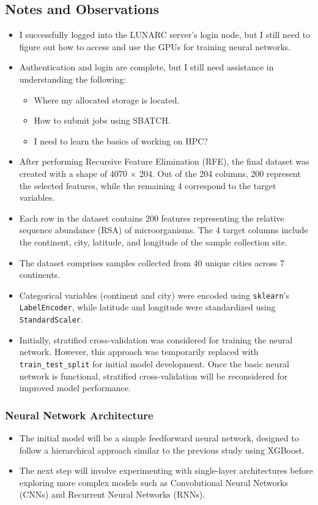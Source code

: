 \documentclass{article}
\begin{document}
\subsection*{Notes and Observations}
\begin{itemize}
    \item I successfully logged into the LUNARC server’s login node, but I still need to figure out how to access and use the GPUs for training neural networks.
    \item Authentication and login are complete, but I still need assistance in understanding the following:
    \begin{itemize}
        \item Where my allocated storage is located.
        \item How to submit jobs using SBATCH.
        \item I need to learn the basics of working on HPC?
    \end{itemize}
    \item After performing Recursive Feature Elimination (RFE), the final dataset was created with a shape of 4070 × 204. Out of the 204 columns, 200 represent the selected features, while the remaining 4 correspond to the target variables.
    \item Each row in the dataset contains 200 features representing the relative sequence abundance (RSA) of microorganisms. The 4 target columns include the continent, city, latitude, and longitude of the sample collection site.
    \item The dataset comprises samples collected from 40 unique cities across 7 continents.
    \item Categorical variables (continent and city) were encoded using \texttt{sklearn}'s \texttt{LabelEncoder}, while latitude and longitude were standardized using \texttt{StandardScaler}.
    \item Initially, stratified cross-validation was considered for training the neural network. However, this approach was temporarily replaced with \texttt{train\_test\_split} for initial model development. Once the basic neural network is functional, stratified cross-validation will be reconsidered for improved model performance.
\end{itemize}

\subsubsection*{Neural Network Architecture}
\begin{itemize}
    \item The initial model will be a simple feedforward neural network, designed to follow a hierarchical approach similar to the previous study using XGBoost.
    \item The next step will involve experimenting with single-layer architectures before exploring more complex models such as Convolutional Neural Networks (CNNs) and Recurrent Neural Networks (RNNs).
\end{itemize}
\end{document}
